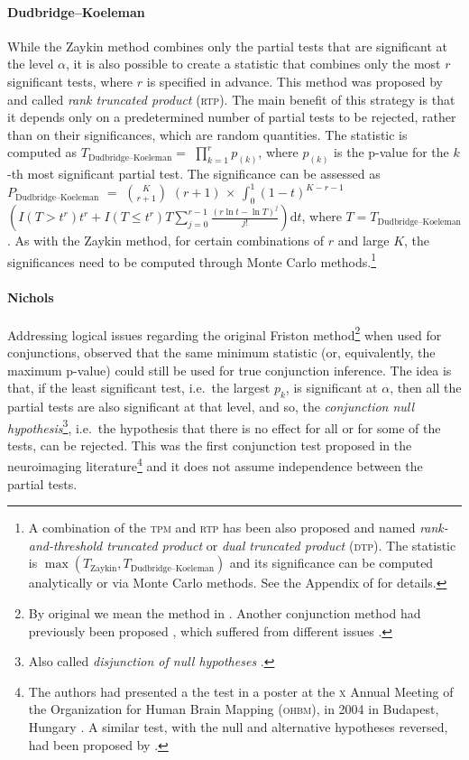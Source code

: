 \paragraph{Dudbridge--Koeleman} While the Zaykin method combines only the partial tests that are significant at the level $\alpha$, it is also possible to create a statistic that combines only the most $r$ significant tests, where $r$ is specified in advance. This method was proposed by \citet{Dudbridge2003} and called \emph{rank truncated product} (\textsc{rtp}). The main benefit of this strategy is that it depends only on a predetermined number of partial tests to be rejected, rather than on their significances, which are random quantities. The statistic is computed as $T_{\text{Dudbridge--Koeleman}}=$ $\prod_{k=1}^{r} p_{(k)}$, where $p_{(k)}$ is the p-value for the $k$-th most significant partial test. The significance can be assessed as $P_{\text{Dudbridge--Koeleman}}$ $=$ $\binom{K}{r+1}$ $\left(r+1\right)$ $\times$ $\int_0^1\left(1-t\right)^{K-r-1}$ $\left(I\left(T > t^{r}\right) t^{r} + I\left(T \leqslant t^{r}\right) T \sum_{j=0}^{r-1}\frac{\left(r\ln t - \ln T\right)^{j}}{j!}\right) \mathrm{d}t$, where $T=T_{\text{Dudbridge--Koeleman}}$. As with the Zaykin method, for certain combinations of $r$ and large $K$, the significances need to be computed through Monte Carlo methods.\footnote{A combination of the \textsc{tpm} and \textsc{rtp} has been also proposed and named \emph{rank-and-threshold truncated product} or \emph{dual truncated product} (\textsc{dtp}). The statistic is $\max\left(T_{\text{Zaykin}},T_{\text{Dudbridge--Koeleman}}\right)$ and its significance can be computed analytically or via Monte Carlo methods. See the Appendix of \citet{Dudbridge2003} for details.}

\paragraph{Nichols} Addressing logical issues regarding the original Friston method\footnote{By original we mean the method in \citet{Friston1999}. Another conjunction method had previously been proposed \citep{Price1997}, which suffered from different issues \citep{Caplan2004}.} when used for conjunctions, \citet{Nichols2005} observed that the same minimum statistic (or, equivalently, the maximum p-value) could still be used for true conjunction inference. The idea is that, if the least significant test, i.e.\ the largest $p_{k}$, is significant at $\alpha$, then all the partial tests are also significant at that level, and so, the \emph{conjunction null hypothesis}\footnote{Also called \emph{disjunction of null hypotheses} \citep{Benjamini2008}.}, i.e.\ the hypothesis that there is no effect for all or for some of the tests, can be rejected. This was the first conjunction test proposed in the neuroimaging literature\footnote{The authors had presented a the test in a poster at the \textsc{x} Annual Meeting of the Organization for Human Brain Mapping (\textsc{ohbm}), in 2004 in Budapest, Hungary \citep{Brett2004}. A similar test, with the null and alternative hypotheses reversed, had been proposed by \citet{Berger1982}.} and it does not assume independence between the partial tests.

